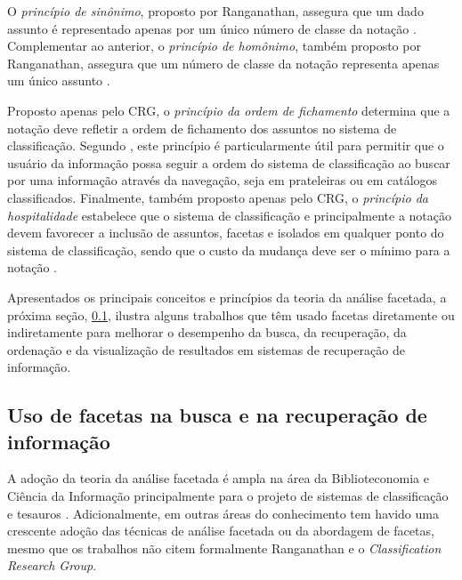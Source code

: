 O \emph{princípio de sinônimo}, proposto por Ranganathan, assegura que um dado assunto é representado apenas por um único número de classe da notação \cite{spiteri98simplified}. Complementar ao anterior, o \emph{princípio de homônimo}, também proposto por Ranganathan, assegura que um número de classe da notação representa apenas um único assunto \cite{spiteri98simplified}.

Proposto apenas pelo CRG, o \emph{princípio da ordem de fichamento} determina que a notação deve refletir a ordem de fichamento dos assuntos no sistema de classificação. Segundo , este princípio é particularmente útil para permitir que o usuário da informação possa seguir a ordem do sistema de classificação ao buscar por uma informação através da navegação, seja em prateleiras ou em catálogos classificados. Finalmente, também proposto apenas pelo CRG, o \emph{princípio da hospitalidade} estabelece que o sistema de classificação e principalmente a notação devem favorecer a inclusão de assuntos, facetas e isolados em qualquer ponto do sistema de classificação, sendo que o custo da mudança deve ser o mínimo para a notação \cite{spiteri98simplified}.

Apresentados os principais conceitos e princípios da teoria da análise facetada, a próxima seção, \ref{usoFacetas}, ilustra alguns trabalhos que têm usado facetas diretamente ou indiretamente para melhorar o desempenho da busca, da recuperação, da ordenação e da visualização de resultados em sistemas de recuperação de informação.




\subsection{Uso de facetas na busca e na recuperação de informação}
\label{usoFacetas}

A adoção da teoria da análise facetada é ampla na área da Biblioteconomia e Ciência da Informação principalmente para o projeto de sistemas de classificação e tesauros \cite{broughton2006}. Adicionalmente, em outras áreas do conhecimento tem havido uma crescente adoção das técnicas de análise facetada ou da abordagem de facetas, mesmo que os trabalhos não citem formalmente Ranganathan e o \textit{Classification Research Group}. 

